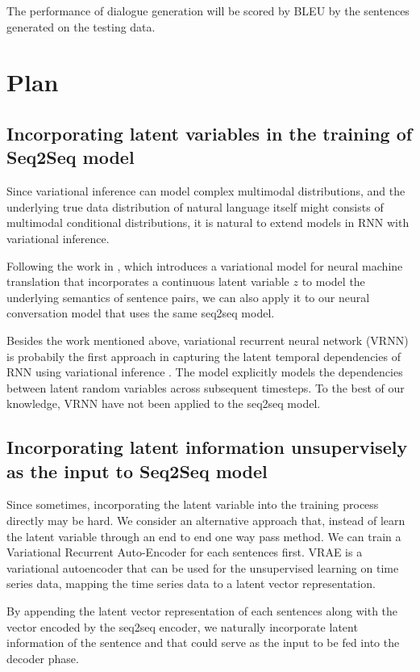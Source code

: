 \documentclass{article}
\begin{document}
The performance of dialogue generation will be scored by BLEU by the sentences generated on the testing data. 
 

\section{Plan}

\subsection{Incorporating latent variables in the training of Seq2Seq model}
Since variational inference can model complex multimodal distributions, and the underlying true data distribution of natural language itself might consists of multimodal conditional distributions, it is natural to extend models in RNN with variational inference.

Following the work in \cite{vnmt}, which introduces a variational model for neural machine translation that incorporates a continuous latent variable $z$ to model the underlying semantics of sentence pairs, we can also apply it to our neural conversation model that uses the same seq2seq model. 

Besides the work mentioned above, variational recurrent neural network (VRNN) is probabily the first approach in capturing the latent temporal dependencies of RNN using variational inference \cite{vrnn}. The model explicitly models the dependencies between latent random variables across subsequent timesteps. To the best of our knowledge, VRNN have not been applied to the seq2seq model.

\subsection{Incorporating latent information unsupervisely as the input to Seq2Seq model}
Since sometimes, incorporating the latent variable into the training process directly may be hard. We consider an alternative approach that, instead of learn the latent variable through an end to end one way pass method. We can train a Variational Recurrent Auto-Encoder \cite{vrae} for each sentences first. VRAE is a variational autoencoder that can be used for the unsupervised learning on time series data, mapping the time series data to a latent vector representation. 

By appending the latent vector representation of each sentences along with the vector encoded by the seq2seq encoder, we naturally incorporate latent information of the sentence and that could serve as the input to be fed into the decoder phase.
\end{document}
